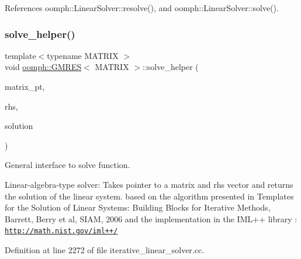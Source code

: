References oomph\+::\+Linear\+Solver\+::resolve(), and oomph\+::\+Linear\+Solver\+::solve().

\mbox{\label{classoomph_1_1GMRES_a29da2c2303b12f3f9fa72423f3daf399}} 
\subsubsection{\texorpdfstring{solve\+\_\+helper()}{solve\_helper()}}
{\footnotesize\ttfamily template$<$typename M\+A\+T\+R\+IX $>$ \\
void \hyperlink{classoomph_1_1GMRES}{oomph\+::\+G\+M\+R\+ES}$<$ M\+A\+T\+R\+IX $>$\+::solve\+\_\+helper (\begin{DoxyParamCaption}\item[{\hyperlink{classoomph_1_1DoubleMatrixBase}{Double\+Matrix\+Base} $\ast$const \&}]{matrix\+\_\+pt,  }\item[{const \hyperlink{classoomph_1_1DoubleVector}{Double\+Vector} \&}]{rhs,  }\item[{\hyperlink{classoomph_1_1DoubleVector}{Double\+Vector} \&}]{solution }\end{DoxyParamCaption})\hspace{0.3cm}{\ttfamily [private]}}



General interface to solve function. 

Linear-\/algebra-\/type solver\+: Takes pointer to a matrix and rhs vector and returns the solution of the linear system. based on the algorithm presented in Templates for the Solution of Linear Systems\+: Building Blocks for Iterative Methods, Barrett, Berry et al, S\+I\+AM, 2006 and the implementation in the I\+M\+L++ library \+: \href{http://math.nist.gov/iml++/}{\tt http\+://math.\+nist.\+gov/iml++/} 

Definition at line 2272 of file iterative\+\_\+linear\+\_\+solver.\+cc.



